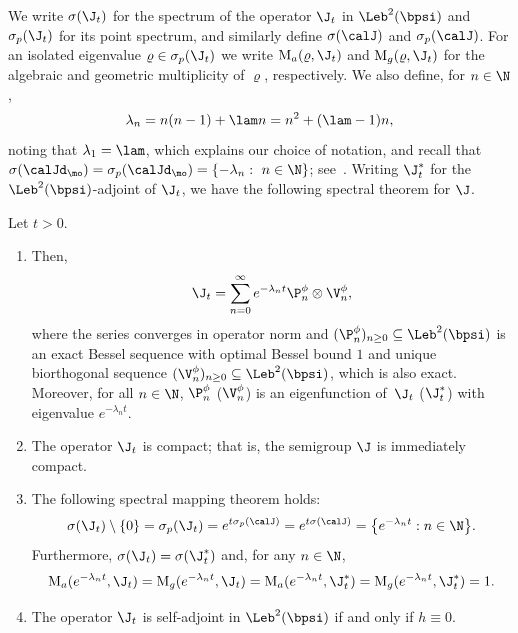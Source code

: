We write $\sigma(\J_t)$ for the spectrum of the operator $\J_t$ in $\Leb^2(\bpsi)$ and $\sigma_p(\J_t)$ for its point spectrum, and similarly define $\sigma(\calJ)$ and $\sigma_p(\calJ)$. For an isolated eigenvalue $\varrho \in \sigma_p(\J_t)$ we write $\mathrm{M}_a(\varrho,\J_t)$ and $\mathrm{M}_g(\varrho,\J_t)$ for the algebraic and geometric multiplicity of $\varrho$, respectively. We also define, for $n \in \N$,
\begin{equation}
\label{eq:def-lambda-n}
\lambda_{n} = n(n-1)+\lam n = n^2+(\lam-1)n,
\end{equation}
noting that $\lambda_{1} = \lam$, which explains our choice of notation, and recall that $\sigma(\calJd_\mo) = \sigma_p(\calJd_\mo) = \{-\lambda_n: \ n \in \N\}$; see~. Writing $\J_t^*$ for the $\Leb^2(\bpsi)$-adjoint of $\J_t$, we have the following spectral theorem for $\J$.

\begin{theorem}
\label{thm:spectral-representation} Let $t > 0$.
\begin{enumerate}
\item \label{item-1:thm:spectral-representation} Then,
\begin{equation*}
\J_t = \sum_{n=0}^{\infty} e^{-\lambda_n t} \P_n^\phi \otimes \V_n^\phi,
\end{equation*}
where the series converges in operator norm and $(\P_n^\phi)_{n \geq 0} \subseteq \Leb^2(\bpsi)$ is an exact Bessel sequence with optimal Bessel bound $1$ and unique biorthogonal sequence $(\V_n^\phi)_{n \geq 0} \subseteq \Leb^2(\bpsi)$, which is also exact. Moreover, for all $n \in \N$, $\P_n^\phi$ ($\V_n^\phi$) is an eigenfunction of~$\J_t$ ($\J_t^*$) with eigenvalue $e^{-\lambda_n t}$.
\item \label{item-2:thm:spectral-representation} {The operator $\J_t$ is compact; that is, the semigroup $\J$ is immediately compact.}
\item \label{item-3:thm:spectral-representation} The following spectral mapping theorem holds:
\begin{equation*}
\sigma(\J_t) \setminus \{0\} = \sigma_p(\J_t) = e^{t\sigma_p(\calJ)} = e^{t\sigma(\calJ)} =\bigl\lbrace e^{-\lambda_n t} : n \in \N \bigr\rbrace.
\end{equation*}
Furthermore, $\sigma(\J_t) = \sigma(\J_t^*)$ and, for any $n \in \N$,
\begin{equation*}
\mathrm{M}_a(e^{-\lambda_n t},\J_t) = \mathrm{M}_g(e^{-\lambda_n t},\J_t) = \mathrm{M}_a(e^{-\lambda_n t},\J_t^*) = \mathrm{M}_g(e^{-\lambda_n t},\J_t^*) = 1.
\end{equation*}
\item \label{item-4:thm:spectral-representation} The operator $\J_t$ is self-adjoint in $\Leb^2(\bpsi)$ if and only if $h \equiv 0$.
\end{enumerate}
\end{theorem}

